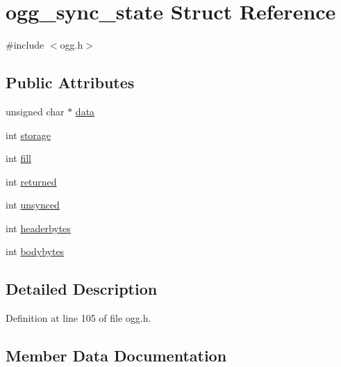 \hypertarget{structogg__sync__state}{}\section{ogg\+\_\+sync\+\_\+state Struct Reference}
\label{structogg__sync__state}


{\ttfamily \#include $<$ogg.\+h$>$}

\subsection*{Public Attributes}
\begin{DoxyCompactItemize}
\item 
unsigned char $\ast$ \mbox{\hyperlink{structogg__sync__state_adfc3f5d5a6434a582205ece0327fcc7d}{data}}
\item 
int \mbox{\hyperlink{structogg__sync__state_a15fc1bb5161fc4ae87b7a65982776c24}{storage}}
\item 
int \mbox{\hyperlink{structogg__sync__state_a3afef65cd358eab5827304b8c2360c7f}{fill}}
\item 
int \mbox{\hyperlink{structogg__sync__state_ac1b56ee81f71737f2f6397907f55a2e9}{returned}}
\item 
int \mbox{\hyperlink{structogg__sync__state_a8d538bb32400470f00080e2160158a76}{unsynced}}
\item 
int \mbox{\hyperlink{structogg__sync__state_abb64d78f386bc413527df838f2f681d5}{headerbytes}}
\item 
int \mbox{\hyperlink{structogg__sync__state_aa7ea6e81b751baaa04e4b49cb04e8317}{bodybytes}}
\end{DoxyCompactItemize}


\subsection{Detailed Description}


Definition at line 105 of file ogg.\+h.



\subsection{Member Data Documentation}
\mbox{\label{structogg__sync__state_aa7ea6e81b751baaa04e4b49cb04e8317}} 
